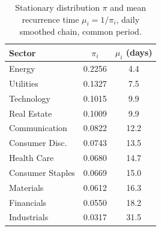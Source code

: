 \begin{table}[htbp]\centering
\caption{Stationary distribution $\pi$ and mean recurrence time $\mu_i=1/\pi_i$, daily smoothed chain, common period.}
\label{tab:pi}
\begin{tabular}{lcc}
\toprule
Sector & $\pi_i$ & $\mu_i$ (days) \\
\midrule
Energy & 0.2256 & 4.4 \\
Utilities & 0.1327 & 7.5 \\
Technology & 0.1015 & 9.9 \\
Real Estate & 0.1009 & 9.9 \\
Communication & 0.0822 & 12.2 \\
Consumer Disc. & 0.0743 & 13.5 \\
Health Care & 0.0680 & 14.7 \\
Consumer Staples & 0.0669 & 15.0 \\
Materials & 0.0612 & 16.3 \\
Financials & 0.0550 & 18.2 \\
Industrials & 0.0317 & 31.5 \\
\bottomrule
\end{tabular}
\end{table}